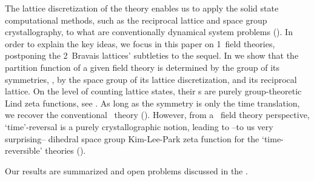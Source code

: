 The lattice discretization of the theory enables us to apply the
solid state computational methods, such as the reciprocal lattice and
space group crystallography, to what are conventionally dynamical
system problems (). In order to explain the
key ideas,
we focus in this paper on 1\dmn\ field theories, postponing the
2\dmn\ Bravais lattices' subtleties to the sequel.
In  we show that the partition function of a
given field theory is determined by the group of its symmetries, \ie,
by the space group of its lattice discretization,
and its reciprocal lattice.
On the level of counting lattice states, their {\tzeta}s are purely
group-theoretic Lind zeta functions, see .
As long as the symmetry is only the time translation, we recover the
conventional \po\ theory
().
However, from a \spt\ field theory perspective, `time'-reversal is a
purely crystallographic notion, leading to --to us very surprising--
dihedral space group Kim-Lee-Park zeta function
for the  `time-reversible' theories
().

Our results are summarized and open problems discussed in the
.
